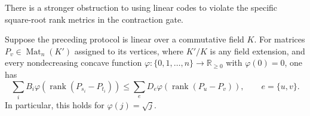 There is a stronger obstruction to using linear codes to violate the
specific square-root rank metrics in the contraction gate.

\begin{proposition}
Suppose the preceding protocol is linear over a commutative field $K$.
For matrices $P_v\in\operatorname{Mat}_n(K')$ assigned to its vertices,
where $K'/K$ is any field extension, and every nondecreasing concave
function $\varphi:\{0,1,\ldots,n\}\to\mathbb R_{\ge0}$ with
$\varphi(0)=0$, one has
\[
 \sum_i B_i\varphi\!\left(\operatorname{rank}(P_{s_i}-P_{t_i})\right)
 \le
 \sum_e D_e\varphi\!\left(\operatorname{rank}(P_u-P_v)\right),
 \qquad e=\{u,v\}.
 \tag{EX38.1}
\]
In particular, this holds for $\varphi(j)=\sqrt j$.
\end{proposition}
